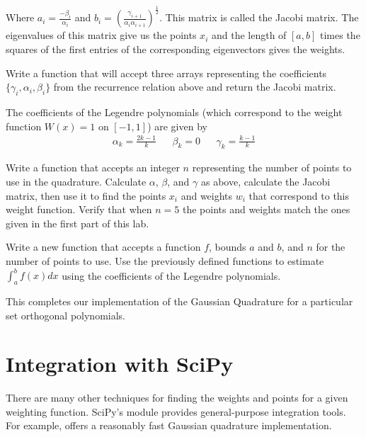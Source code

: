 Where $a_i = \frac{-\beta_i}{\alpha_i}$ and $b_i = (\frac{\gamma_{i+1}}{\alpha_i \alpha_{i+1}})^{\frac{1}{2}}$.
This matrix is called the Jacobi matrix.
The eigenvalues of this matrix give us the points $x_i$ and the length of $\left[a, b\right]$ times the squares of the first entries of the corresponding eigenvectors gives the weights.

\begin{problem} %
Write a function that will accept three arrays representing the coefficients $\{\gamma_i, \alpha_i, \beta_i\}$ from the recurrence relation above and return the Jacobi matrix.
\end{problem}

\begin{problem} %
The coefficients of the Legendre polynomials (which correspond to the weight function $W(x) = 1$ on $[-1,1]$) are given by
\begin{align}\nonumber
\alpha_k = \frac{2k - 1}{k} && \beta_k = 0 && \gamma_k = \frac{k-1}{k}
\end{align}

Write a function that accepts an integer $n$ representing the number of points to use in the quadrature. Calculate $\alpha$, $\beta$, and $\gamma$ as above, calculate the Jacobi matrix, then use it to find the points $x_i$ and weights $w_i$ that correspond to this weight function.
Verify that when $n=5$ the points and weights match the ones given in the first part of this lab.
\end{problem}

\begin{problem} %
Write a new function that accepts a function $f$, bounds $a$ and $b$, and $n$ for the number of points to use.
Use the previously defined functions to estimate $\int_a^b f(x)dx$ using the coefficients of the Legendre polynomials.

This completes our implementation of the Gaussian Quadrature for a particular set orthogonal polynomials.
\end{problem}

\section*{Integration with SciPy} %

There are many other techniques for finding the weights and points for a given weighting function.
SciPy's  module provides general-purpose integration tools.
For example,  offers a reasonably fast Gaussian quadrature implementation.

